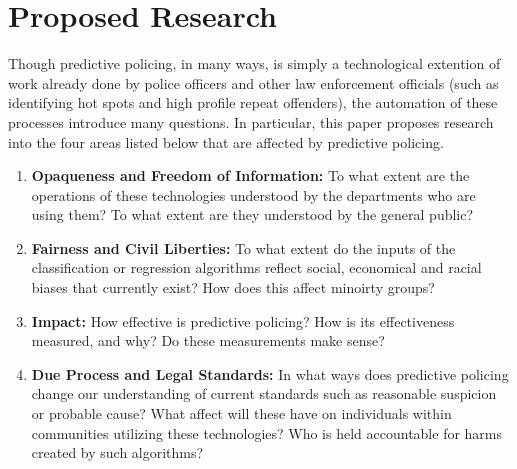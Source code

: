 \documentclass[12pt]{article} %
\begin{document}









\section{Proposed Research}\label{sec:proposedresearch} %

Though predictive policing, in many ways, is simply a technological extention of work already done by police officers and other law enforcement officials (such as identifying hot spots and high profile repeat offenders)\cite{perryetal}, the automation of these processes introduce many questions. In particular, this paper proposes research into the four areas listed below that are affected by predictive policing.

\begin{enumerate}
\item \textbf{Opaqueness and Freedom of Information:} To what extent are the operations of these technologies understood by the departments who are using them? To what extent are they understood by the general public?
\item \textbf{Fairness and Civil Liberties:} To what extent do the inputs of the classification or regression algorithms reflect social, economical and racial biases that currently exist? How does this affect minoirty groups? 
\item \textbf{Impact:} How effective is predictive policing? How is its effectiveness measured, and why? Do these measurements make sense?
\item \textbf{Due Process and Legal Standards:} In what ways does predictive policing change our understanding of current standards such as reasonable suspicion or probable cause? What affect will these have on individuals within communities utilizing these technologies? Who is held accountable for harms created by such algorithms?
\end{enumerate}
\end{document}
